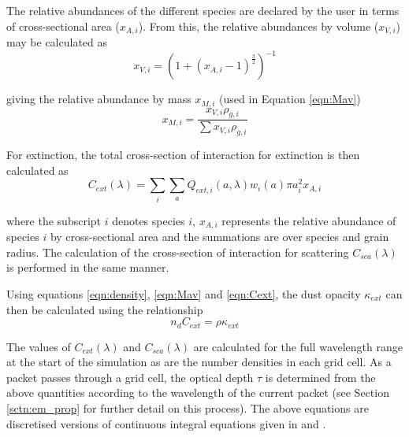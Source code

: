 The relative abundances of the different species are declared by the user in terms of cross-sectional area ($x_{A,i}$).  From this, the relative abundances by volume ($x_{V,i}$) may be calculated as
\begin{equation}
x_{V,i}=(1+(x_{A,i}-1)^{\frac{3}{2}})^{-1}
\end{equation} 

\noindent giving the relative abundance by mass $x_{M,i}$ (used in Equation \ref{eqn:Mav})  
\begin{equation}
x_{M,i}=\frac{x_{V,i}\rho_{g,i}}{\sum x_{V,i}\rho_{g,i}}
\end{equation} 


\noindent For extinction, the total cross-section of interaction for extinction is then calculated as
\begin{equation}
\label{eqn:Cext}
C_{ext}(\lambda) = \sum_{i} \sum_a Q_{ext,i}(a,\lambda) w_i(a) \pi a_i^2 x_{A,i}  
\end{equation}

\noindent where the subscript $i$ denotes species $i$, $x_{A,i}$ represents the relative abundance of species $i$ by cross-sectional area and the summations are over species and grain radius.  The calculation of the cross-section of interaction for scattering $C_{sca}(\lambda)$ is performed in the same manner.  




Using equations \ref{eqn:density}, \ref{eqn:Mav} and \ref{eqn:Cext}, the dust opacity $\kappa_{ext}$ can then be calculated using the relationship
\begin{equation}
n_dC_{ext}=\rho \kappa_{ext}
\end{equation} 

The values of $C_{ext}(\lambda)$ and $C_{sca}(\lambda)$ are calculated for the full wavelength range at the start of the simulation as are the number densities in each grid cell.  As a packet passes through a grid cell, the optical depth $\tau$ is determined from the above quantities according to the wavelength of the current packet (see Section \ref{sctn:em_prop} for further detail on this process).  The above equations are discretised versions of continuous integral equations given in \citet{hulst1957} and \citet{tielens2005}.



